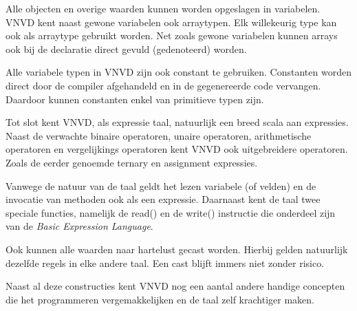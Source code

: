 Alle objecten en overige waarden kunnen worden opgeslagen in variabelen. VNVD kent naast gewone variabelen ook arraytypen. Elk willekeurig type kan ook als arraytype gebruikt worden. Net zoals gewone variabelen kunnen arrays ook bij de declaratie direct gevuld (gedenoteerd) worden.

Alle variabele typen in VNVD zijn ook constant te gebruiken. Constanten worden direct door de compiler afgehandeld en in de gegenereerde code vervangen. Daardoor kunnen constanten enkel van primitieve typen zijn.

Tot slot kent VNVD, als expressie taal, natuurlijk een breed scala aan expressies. Naast de verwachte binaire operatoren, unaire operatoren, arithmetische operatoren en vergelijkings operatoren kent VNVD ook uitgebreidere operatoren. Zoals de eerder genoemde ternary en assignment expressies.

Vanwege de natuur van de taal geldt het lezen variabele (of velden) en de invocatie van methoden ook als een expressie. Daarnaast kent de taal twee speciale functies, namelijk de read() en de write() instructie die onderdeel zijn van de \emph{Basic Expression Language}.

Ook kunnen alle waarden naar hartelust gecast worden. Hierbij gelden natuurlijk dezelfde regels in elke andere taal. Een cast blijft immers niet zonder risico.

Naast al deze constructies kent VNVD nog een aantal andere handige concepten die het programmeren vergemakkelijken en de taal zelf krachtiger maken.
